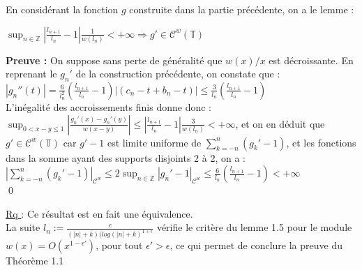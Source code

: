 \documentclass[11pt,a4paper]{article}
\begin{document}
En considérant la fonction $g$ construite dans la partie précédente, on a le lemme :

\begin{lemma}
$ \displaystyle \sup_{n\in \mathbb{Z}} \left |\frac{l_{n+1}}{l_n}-1 \right |\frac{1}{w(l_n)} <+ \infty \Rightarrow g' \in \mathcal{C}^w(\mathbb{T})$
\end{lemma}

\textbf{Preuve :} On suppose sans perte de généralité que $w(x)/x$ est décroissante. En reprenant le $g_n'$ de la construction précédente, on constate que :  \\

$\displaystyle |g_n''(t)| = \frac{6}{l_n^2}(\frac{l_{n+1}}{l_n}-1)|(c_n-t + b_n -t)| \leq  \frac{3}{l_n}(\frac{l_{n+1}}{l_n}-1) $ \\

L'inégalité des accroissements finis donne donc : \\

$\displaystyle \sup_{0<x-y\leq 1} \left | \frac{g_n'(x) - g_n'(y)}{w(x-y)}\right | \leq \left | \frac{l_{n+1}}{l_n}-1\right | \frac{3}{w(l_n)} < +\infty$, et on en déduit que $g' \in \mathcal{C}^w(\mathbb{T})$ car $g'-1$ est limite uniforme de $\displaystyle  \sum_{k = -n}^n (g_k'-1)$, et les fonctions dans la somme ayant des supports disjoints 2 à 2, on a :\\

$\displaystyle  \left | \sum_{k = -n}^n (g_k'-1) \right |_{\mathcal{C}^w} \leq 2\sup_{n \in \mathbb{Z}} |g_n' -1|_{\mathcal{C}^w} \leq \frac{6}{l_n}(\frac{l_{n+1}}{l_n}-1) < + \infty $ \\ \qed

\underline{Rq }: Ce résultat est en fait une équivalence. \\

La suite $ \displaystyle l_n := \frac{c}{(|n|+k)(log(|n| + k)^{1+\epsilon}}$ vérifie le critère du lemme 1.5 pour le module $w(x)=O(x^{1-\epsilon'})$, pour tout $\epsilon' > \epsilon$, ce qui permet de conclure la preuve du Théorème 1.1


\newpage
\printbibliography[heading=bibintoc, title={Références}]
\end{document}
